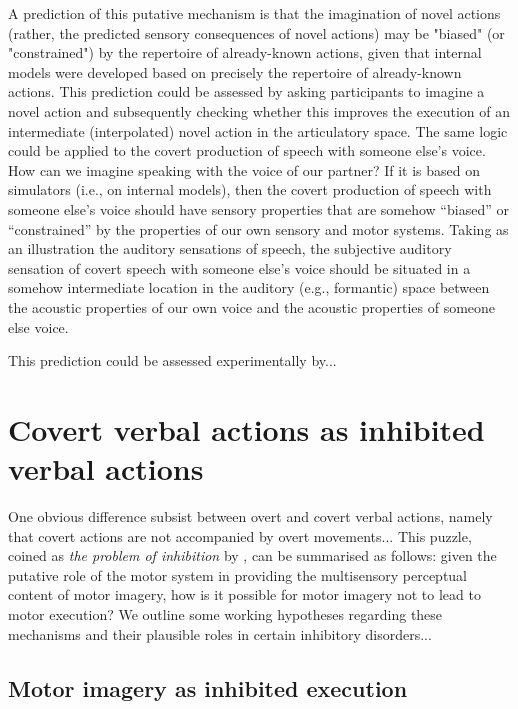 \documentclass[utf8]{template/frontiersSCNS} %
\begin{document}
A prediction of this putative mechanism is that the imagination of novel actions (rather, the predicted sensory consequences of novel actions) may be "biased" (or "constrained") by the repertoire of already-known actions, given that internal models were developed based on precisely the repertoire of already-known actions. This prediction could be assessed by asking participants to imagine a novel action and subsequently checking whether this improves the execution of an intermediate (interpolated) novel action in the articulatory space. The same logic could be applied to the covert production of speech with someone else’s voice. How can we imagine speaking with the voice of our partner? If it is based on simulators (i.e., on internal models), then the covert production of speech with someone else’s voice should have sensory properties that are somehow “biased” or “constrained” by the properties of our own sensory and motor systems. Taking as an illustration the auditory sensations of speech, the subjective auditory sensation of covert speech with someone else’s voice should be situated in a somehow intermediate location in the auditory (e.g., formantic) space between the acoustic properties of our own voice and the acoustic properties of someone else voice.

This prediction could be assessed experimentally by...

\section{Covert verbal actions as inhibited verbal actions}

One obvious difference subsist between overt and covert verbal actions, namely that covert actions are not accompanied by overt movements... This puzzle, coined as \textit{the problem of inhibition} by \cite{jeannerod_neural_2001}, can be summarised as follows: given the putative role of the motor system in providing the multisensory perceptual content of motor imagery, how is it possible for motor imagery not to lead to motor execution? We outline some working hypotheses regarding these mechanisms and their plausible roles in certain inhibitory disorders...

\subsection{Motor imagery as inhibited execution}

\end{document}
